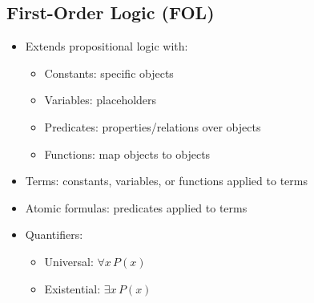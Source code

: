 \subsection{First-Order Logic (FOL)}
\begin{itemize}
    \item Extends propositional logic with:
    \begin{itemize}
        \item Constants: specific objects
        \item Variables: placeholders
        \item Predicates: properties/relations over objects
        \item Functions: map objects to objects
    \end{itemize}
    \item Terms: constants, variables, or functions applied to terms
    \item Atomic formulas: predicates applied to terms
    \item Quantifiers:
    \begin{itemize}
        \item Universal: $\forall x \, P(x)$
        \item Existential: $\exists x \, P(x)$
    \end{itemize}
\end{itemize}


